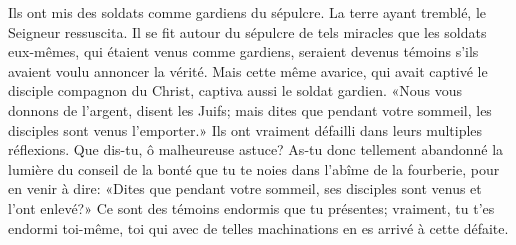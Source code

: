 Ils ont mis des soldats comme gardiens du sépulcre.
La terre ayant tremblé, le Seigneur ressuscita.
Il se fit autour du sépulcre de tels miracles
	que les soldats eux-mêmes, qui étaient venus comme gardiens,
	seraient devenus témoins s’ils avaient voulu annoncer la vérité.
Mais cette même avarice, qui avait captivé le disciple compagnon du Christ,
	captiva aussi le soldat gardien.
«Nous vous donnons de l’argent, disent les Juifs;
	mais dites que pendant votre sommeil, les disciples sont venus l’emporter.»
Ils ont vraiment défailli dans leurs multiples réflexions.
Que dis-tu, ô malheureuse astuce?
	As-tu donc tellement abandonné la lumière du conseil de la bonté
	que tu te noies dans l’abîme de la fourberie, pour en venir à dire:
	«Dites que pendant votre sommeil, ses disciples sont venus et l’ont enlevé?»
Ce sont des témoins endormis que tu présentes;
	vraiment, tu t’es endormi toi-même,
	toi qui avec de telles machinations en es arrivé à cette défaite.
